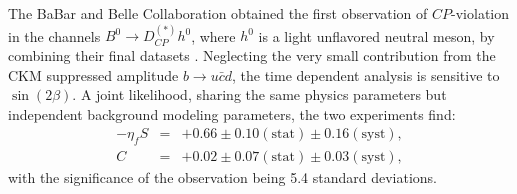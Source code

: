 The BaBar and Belle Collaboration obtained the first observation of $CP$-violation
in the channels $B^0 \to D^{(*)}_{CP} h^0$, where $h^0$ is a light unflavored neutral
meson, by combining their final datasets \cite{babar_belle_D0h0}. Neglecting the
very small contribution from the CKM suppressed amplitude $b \to u\bar{c}d$,
the time dependent analysis is sensitive to $\sin(2\beta)$. A joint likelihood,
sharing the same physics parameters but independent background modeling parameters,
the two experiments find:
\begin{eqnarray}
-\eta_f S & = & +0.66 \pm 0.10 (\mbox{stat}) \pm 0.16 (\mbox{syst}), \\
C & = & +0.02 \pm 0.07 (\mbox{stat}) \pm 0.03 (\mbox{syst}), 
\end{eqnarray}
with the significance of the observation being 5.4 standard deviations. 
